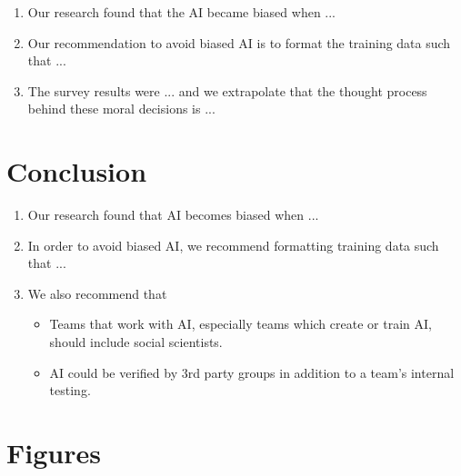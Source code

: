 \documentclass{report}
\begin{document}
\begin{enumerate}
    \item Our research found that the AI became biased when ...
    
    \item Our recommendation to avoid biased AI is to format the training data such that ...
    
    \item The survey results were ... and we extrapolate that the thought process behind these moral
    decisions is ...
\end{enumerate}

\chapter{Conclusion}

\begin{enumerate}
    \item Our research found that AI becomes biased when ...
    
    \item In order to avoid biased AI, we recommend formatting training data such that ...
    
    \item We also recommend that
    \begin{itemize}
        \item Teams that work with AI, especially teams which create or train AI, should include
        social scientists.
        
        \item AI could be verified by 3rd party groups in addition to a team's internal testing.
    \end{itemize}
\end{enumerate}




\appendix
\chapter{Figures}
\end{document}
